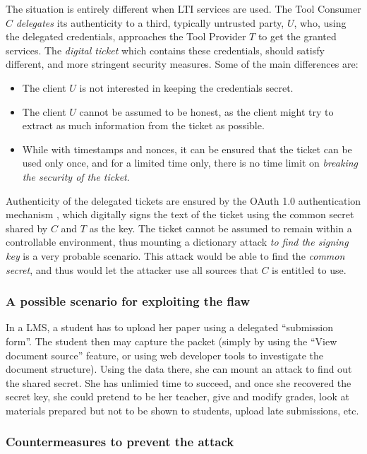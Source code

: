 \documentclass{article}
\begin{document}
The situation is entirely different when LTI services are used. The Tool
Consumer $C$ {\it delegates} its authenticity to a third, typically
untrusted party, $U$, who, using the delegated credentials, approaches the
Tool Provider $T$ to get the granted services.
The {\it digital ticket}
which contains these credentials, should satisfy different, and more
stringent security measures. Some of the main differences are:
\begin{itemize}
\item The client $U$ is not interested in keeping the credentials secret.
\item The client $U$ cannot be assumed to be honest, as the client might
try to extract as much information from the ticket as possible.
\item While with timestamps and nonces, it can be ensured that the ticket can be used only once,
and for a limited time only, there is no time limit on {\it breaking 
the security of the ticket}.
\end{itemize}
Authenticity of the delegated tickets are ensured by the OAuth 1.0
authentication mechanism \cite{oauth1}, which digitally signs the
text of the ticket using the common secret shared by $C$ and $T$ as the key.
The ticket cannot be assumed to remain within a controllable environment,
thus mounting a dictionary attack {\it to find the signing key} is
a very probable scenario. This attack would be able to find the {\it common
secret}, and thus would let the attacker use all sources that $C$ is entitled
to use.

\subsubsection*{A possible scenario for exploiting the flaw}

In a LMS, a student has to upload her paper using a delegated ``submission
form''. The student then may capture the packet (simply by using the ``View document
source'' feature, or using web developer tools to investigate the document structure). Using
the data there, she can mount an attack to find out the shared secret. She
has unlimied time to succeed, and once she
recovered the secret key, she could pretend to be her teacher, give and
modify grades, look at materials prepared but not to be shown to students,
upload late submissions, etc.


\subsubsection*{Countermeasures to prevent the attack}
\end{document}
